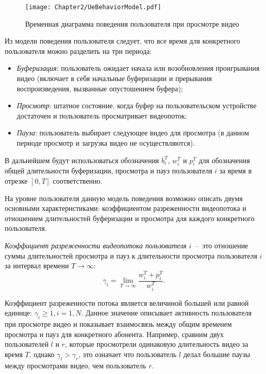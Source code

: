 \begin{figure}[htbp]
\begin{center}
\texttt{[image: Chapter2/UeBehaviorModel.pdf]}
\caption{Временная диаграмма поведения пользователя при просмотре видео}
\label{fig:UeBehaviorModel}
\end{center}
\end{figure}

Из модели поведения пользователя следует, что все время для конкретного пользователя можно разделить на три периода:
\begin{itemize}
	\item \textit{Буферизация}: пользователь ожидает начала или возобновления проигрывания видео (включает в себя начальные буферизации и прерывания воспроизведения, вызванные опустошением буфера);
	\item \textit{Просмотр}: штатное состояние, когда буфер на пользовательском устройстве достаточен и пользователь просматривает видеопоток;
	\item \textit{Пауза}: пользователь выбирает следующее видео для просмотра (в данном периоде просмотр и загрузка видео не осуществляются).
\end{itemize}
В дальнейшем будут использоваться обозначения $b_i^T$, $w_i^T$ и $p_i^T$ для обозначения общей длительности буферизации, просмотра и пауз пользователя $i$ за время в отрезке $[0, T]$ соответственно.

На уровне пользователя данную модель поведения возможно описать двумя основными характеристиками: коэффициентом разреженности видеопотока и отношением длительностей буферизации и просмотра для каждого конкретного пользователя.

\begin{definition}
\label{def:VideoSparseness}
    \emph{Коэффициент разреженности видеопотока пользователя $i$}~--~это отношение суммы длительностей просмотра и пауз к длительности просмотра пользователя $i$ за интервал времени $T\rightarrow\infty$:
    $$\gamma_i = \lim\limits_{T\rightarrow\infty} \frac{w_i^T + p_i^T}{w_i^T}.$$
\end{definition}

Коэффициент разреженности потока является величиной большей или равной единице: $\gamma_i \geq 1, i=\overline{1,N}$. Данное значение описывает активность пользователя при просмотре видео и показывает взаимосвязь между общим временем просмотра и пауз для конкретного абонента. Например, сравним двух пользователей $l$ и $r$, которые просмотрели одинаковую длительность видео за время $T$, однако $\gamma_l > \gamma_r$, это означает что пользователь $l$ делал большие паузы между просмотрами видео, чем пользователь $r$.

